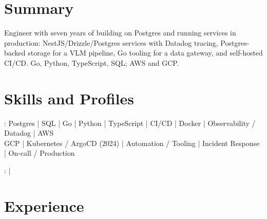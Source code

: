 \documentclass[print]{jack-resume}
\begin{document}
\pagecolor{darkmodeBackground}


\begin{minipage}[t][1cm][t]{.03\textwidth}
    \hfill
\end{minipage}

\section{Summary}
Engineer with seven years of building on Postgres and running services in production: NestJS/Drizzle/Postgres services with Datadog tracing, Postgres-backed storage for a VLM pipeline, Go tooling for a data gateway, and self-hosted CI/CD. Go, Python, TypeScript, SQL; AWS and GCP.
\sectionsep

\section{Skills and Profiles}
:
Postgres \hfill | \hfill
SQL \hfill | \hfill
Go \hfill | \hfill
Python \hfill | \hfill
TypeScript \hfill | \hfill
CI/CD \hfill | \hfill
Docker \hfill | \hfill
Observability / Datadog \hfill | \hfill
AWS \\
\hspace{1.0cm} GCP \hfill | \hfill
Kubernetes / ArgoCD (2024) \hfill | \hfill
Automation / Tooling \hfill | \hfill
Incident Response \hfill | \hfill
On-call / Production \\

\raggedright{
    :
      \href{https://www.linkedin.com/in/jack-sturtevant/}{ \ExternalLink} |
     \href{https://github.com/jacksturt}{ \ExternalLink}}

\section{Experience}
\end{document}

